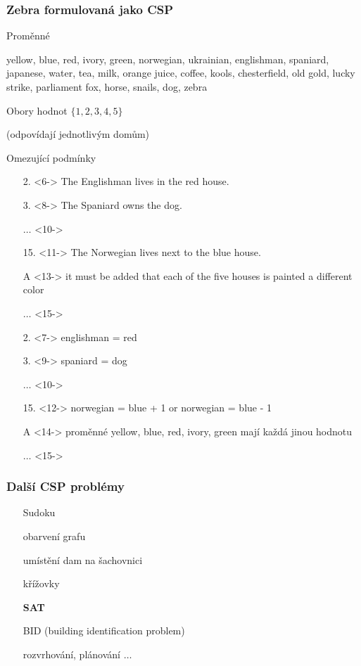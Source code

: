 \documentclass[red,professionalfont]{beamer}
\theoremstyle{definition}
\newcommand{\0}{\mbox{${\bf 0}$}}
\renewcommand{\emph}[1]{{\bf #1}}
\begin{document}
\begin{frame}\frametitle{Zebra formulovaná jako CSP}
\begin{center}
Proměnné
\end{center}\pause
yellow, blue, red, ivory, green, norwegian, ukrainian, englishman, spaniard, japanese, water, tea, milk, orange juice, coffee, 
kools, chesterfield, old gold, lucky strike, parliament fox,  horse, snails, dog, zebra\pause
\begin{center}
Obory hodnot\pause
\vskip 2mm
$\{1,2,3,4,5\}$

{\tiny (odpovídají jednotlivým domům)}

\end{center}\pause

\begin{center}
 Omezující podmínky\pause
 \vskip2mm
{\tiny
\begin{minipage}{5cm}
\begin{itemize}
\item[2.]<6-> The Englishman lives in the red house.
\item[3.]<8-> The Spaniard owns the dog.
\item[$\ldots$]<10->\ 
\item[15.]<11-> The Norwegian lives next to the blue house. 
\item[A]<13-> it must be added that each of the five houses is painted a different color
\item[$\ldots$]<15->\ 
\end{itemize}\pause
\end{minipage}
\begin{minipage}{5.2cm}
\begin{itemize}
 \item[2.]<7-> englishman = red
 \item[3.]<9-> spaniard = dog
 \item[$\ldots$]<10->\ 
 \item[15.]<12-> norwegian = blue + 1 or norwegian = blue - 1
 \item[A]<14-> proměnné yellow, blue, red, ivory, green mají každá jinou hodnotu
 \item[$\ldots$]<15->\ 
\end{itemize}
\end{minipage}
}
\end{center}

\end{frame}

\begin{frame}\frametitle{Další CSP problémy}
 \begin{itemize}
  \item[] Sudoku\pause
  \item[] obarvení grafu\pause
  \item[] umístění dam na šachovnici\pause
  \item[] křížovky\pause
  \item[] \emph{SAT}\pause
  \item[] BID (building identification problem)\pause
  \item[] rozvrhování, plánování $\ldots$
 \end{itemize}
\end{frame}
\end{document}
